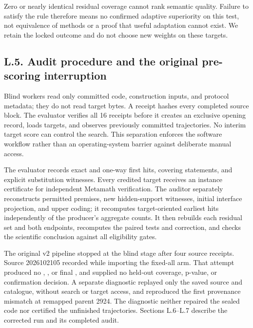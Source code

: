 \documentclass[pdflatex,sn-basic,Numbered]{sn-jnl}
\begin{document}
Zero or nearly identical residual coverage cannot rank semantic quality. Failure to satisfy the rule therefore means no confirmed adaptive superiority on this test, not equivalence of methods or a proof that useful adaptation cannot exist. We retain the locked outcome and do not choose new weights on these targets.

\subsection*{L.5. Audit procedure and the original pre-scoring interruption}\label{l.5.-audit-procedure-and-the-original-pre-scoring-interruption}

Blind workers read only committed code, construction inputs, and protocol metadata; they do not read target bytes. A receipt hashes every completed source block. The evaluator verifies all 16 receipts before it creates an exclusive opening record, loads targets, and observes previously committed trajectories. No interim target score can control the search. This separation enforces the software workflow rather than an operating-system barrier against deliberate manual access.

The evaluator records exact and one-way first hits, covering statements, and explicit substitution witnesses. Every credited target receives an instance certificate for independent Metamath verification. The auditor separately reconstructs permitted premises, new hidden-support witnesses, initial interface projection, and upper coding; it recomputes target-oriented earliest hits independently of the producer's aggregate counts. It then rebuilds each residual set and both endpoints, recomputes the paired tests and correction, and checks the scientific conclusion against all eligibility gates.

The original v2 pipeline stopped at the blind stage after four source receipts. Source 2026102105 recorded  while importing the fixed-all arm. That attempt produced no , , or final , and supplied no held-out coverage, p-value, or confirmation decision. A separate diagnostic replayed only the saved source and catalogue, without search or target access, and reproduced the first provenance mismatch at remapped parent 2924. The diagnostic neither repaired the sealed code nor certified the unfinished trajectories. Sections L.6--L.7 describe the corrected run and its completed audit.
\end{document}

